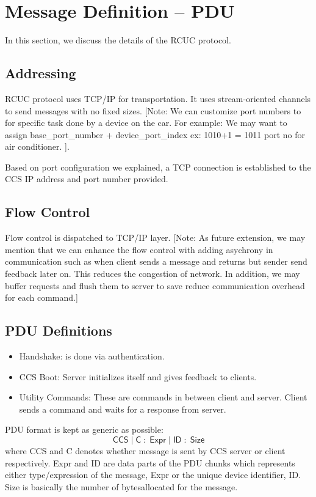 \section{Message Definition -- PDU}
\label{sec:pdus}

In this section, we discuss the details of the \textsf{RCUC} protocol.

\subsection{Addressing}
\label{sec:pdus:addr}
\textsf{RCUC} protocol uses TCP/IP for transportation. It uses stream-oriented channels to send messages with no fixed sizes. [Note: We can customize port numbers to for specific task done by a device on the car. For example: We may want to assign base\_port\_number + device\_port\_index ex: 1010+1 = 1011 port no for air conditioner. ].

Based on port configuration we explained, a TCP connection is established to the \textsf{CCS} IP address and port number provided.
\subsection{Flow Control}
\label{sec:pdus:flow}
Flow control is dispatched to TCP/IP layer. [Note: As future extension, we may mention that we can enhance the flow control with adding asychrony in communication such as when client sends a message  and returns but sender send feedback later on. This reduces the congestion of network. In addition, we may buffer requests and flush them to server to save reduce communication overhead for each command.]
 
\subsection{PDU Definitions}
\label{sec:pdus:pdu}
\begin{itemize}
\item \textsf{Handshake}: is done via authentication.
\item \textsf{CCS Boot}: Server initializes itself and gives feedback to clients.
\item \textsf{Utility Commands}: These are commands in between client and server. Client sends a command and waits for a response from server.
  \end{itemize}


PDU format is kept as generic as possible:
\[\textsf{CCS} \; | \; \textsf{C} \; : \; \textsf{Expr} \; | \; \textsf{ID} \; : \; \textsf{Size} \]
where \textsf{CCS} and \textsf{C} denotes whether message is sent by \textsf{CCS} server or client respectively. \textsf{Expr} and \textsf{ID} are data parts of the PDU chunks which represents either type/expression of the message, \textsf{Expr} or the unique device identifier, \textsf{ID}. \textsf{Size} is basically the number of bytesallocated for the message.

